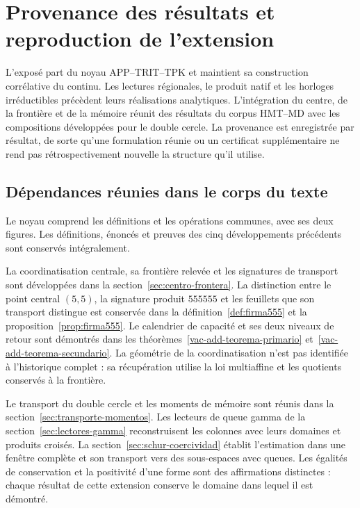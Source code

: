 \section{Provenance des résultats et reproduction de l'extension}
\label{ap:procedencia-reproduccion}
\begingroup
\setlength{\parskip}{1pt}

L'exposé part du noyau APP--TRIT--TPK et maintient sa construction
corrélative du continu. Les lectures régionales, le produit natif et les
horloges irréductibles précèdent leurs réalisations analytiques. L'intégration
du centre, de la frontière et de la mémoire réunit des résultats du corpus HMT--MD avec
les compositions développées pour le double cercle. La provenance est
enregistrée par résultat, de sorte qu'une formulation réunie ou un certificat
supplémentaire ne rend pas rétrospectivement nouvelle la structure qu'il utilise.

\subsection{Dépendances réunies dans le corps du texte}

Le noyau comprend les définitions et les opérations communes, avec
ses deux figures. Les définitions, énoncés et preuves des cinq
développements précédents sont conservés intégralement.

La coordinatisation centrale, sa frontière relevée et les signatures de transport sont développées dans la section~\ref{sec:centro-frontera}. La distinction entre le point central \((5,5)\), la signature produit \(555555\) et les feuillets que son transport distingue est conservée dans la définition~\ref{def:firma555} et la proposition~\ref{prop:firma555}. Le calendrier de capacité et ses deux niveaux de retour sont démontrés dans les théorèmes~\ref{vac-add-teorema-primario} et~\ref{vac-add-teorema-secundario}. La géométrie de la coordinatisation n'est pas identifiée à l'historique complet : sa récupération utilise la loi multiaffine et les quotients conservés à la frontière.

Le transport du double cercle et les moments de mémoire sont réunis dans
la section~\ref{sec:transporte-momentos}. Les lecteurs de queue gamma de
la section~\ref{sec:lectores-gamma} reconstruisent les colonnes avec leurs
domaines et produits croisés. La section~\ref{sec:schur-coercividad}
établit l'estimation dans une fenêtre complète et son transport vers
des sous-espaces avec queues. Les égalités de conservation et la positivité
d'une forme sont des affirmations distinctes : chaque résultat de cette extension
conserve le domaine dans lequel il est démontré.

